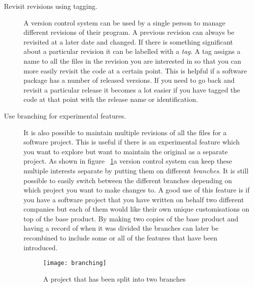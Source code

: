 \begin{description}

  \item [Revisit revisions using tagging.]
  A version control system can be used by a single person to manage different revisions of their program. A previous revision can always be revisited at a later date and changed. If there is something significant about a particular revision it can be labelled with a \emph{tag}. A tag assigns a name to all the files in the revision you are interested in so that you can more easily revisit the code at a certain point.  This is helpful if a software package has a number of released versions.  If you need to go back and revisit a particular release it becomes a lot easier if you have tagged the code at that point with the release name or identification.
   
   

  
  \item [Use branching for experimental features.] 
  It is also possible to maintain multiple revisions of all the files for a software project. This is useful if there is an experimental feature which you want to explore but want to maintain the original as a separate project. As shown in figure ~\ref{fig:bgBranches}a version control system can keep these multiple interests separate by putting them on different \emph{branches}.  It is still possible to easily switch between the different branches depending on which project you want to make changes to.  A good use of this feature is if you have a software project that you have written on behalf two different companies but each of them would like their own unique customisations on top of the base product.  By making two copies of the base product and having a record of when it was divided the branches can later be recombined to include some or all of the features that have been introduced.

  \begin{figure}[h]
   \begin{center}
    \texttt{[image: branching]}
   \end{center}
   \caption{A project that has been split into two branches}
   \label{fig:bgBranches}
  \end{figure}


\end{description}
